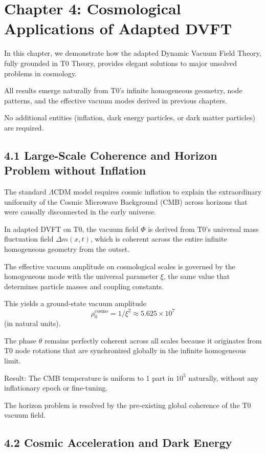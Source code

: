 	\section{Chapter 4: Cosmological Applications of Adapted DVFT}
	
	In this chapter, we demonstrate how the adapted Dynamic Vacuum Field Theory, fully grounded in T0 Theory, provides elegant solutions to major unsolved problems in cosmology.
	
	All results emerge naturally from T0's infinite homogeneous geometry, node patterns, and the effective vacuum modes derived in previous chapters.
	
	No additional entities (inflation, dark energy particles, or dark matter particles) are required.
	
	\subsection{4.1 Large-Scale Coherence and Horizon Problem without Inflation}
	
	The standard $\Lambda$CDM model requires cosmic inflation to explain the extraordinary uniformity of the Cosmic Microwave Background (CMB) across horizons that were causally disconnected in the early universe.
	
	In adapted DVFT on T0, the vacuum field $\Phi$ is derived from T0's universal mass fluctuation field $\Delta m(x,t)$, which is coherent across the entire infinite homogeneous geometry from the outset.
	
	The effective vacuum amplitude on cosmological scales is governed by the homogeneous mode with the universal parameter $\xi$, the same value that determines particle masses and coupling constants.
	
	This yields a ground-state vacuum amplitude
	\[
	\rho_0^{\text{cosmo}} = 1 / \xi^2 \approx 5.625 \times 10^7
	\]
	(in natural units).
	
	The phase $\theta$ remains perfectly coherent across all scales because it originates from T0 node rotations that are synchronized globally in the infinite homogeneous limit.
	
	Result: The CMB temperature is uniform to 1 part in $10^5$ naturally, without any inflationary epoch or fine-tuning.
	
	The horizon problem is resolved by the pre-existing global coherence of the T0 vacuum field.
	
	\subsection{4.2 Cosmic Acceleration and Dark Energy}
	
